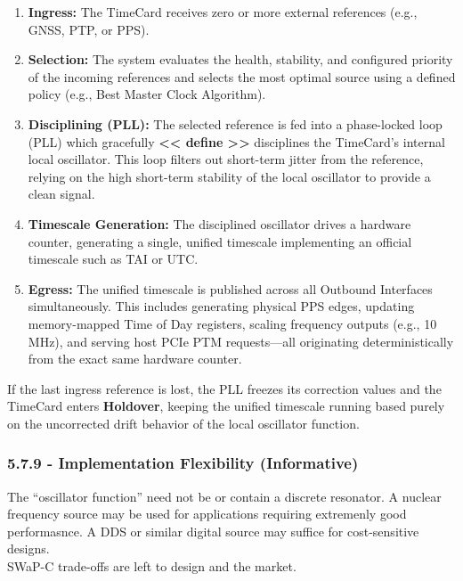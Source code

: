 \documentclass[
]{article}
\begin{document}
\begin{enumerate}
\item
  \textbf{Ingress:} The TimeCard receives zero or more external
  references (e.g., GNSS, PTP, or PPS).
\item
  \textbf{Selection:} The system evaluates the health, stability, and
  configured priority of the incoming references and selects the most
  optimal source using a defined policy (e.g., Best Master Clock
  Algorithm).
\item
  \textbf{Disciplining (PLL):} The selected reference is fed into a
  phase-locked loop (PLL) which gracefully \textbf{\textless\textless{}
  define \textgreater\textgreater{}} disciplines the TimeCard's internal
  local oscillator. This loop filters out short-term jitter from the
  reference, relying on the high short-term stability of the local
  oscillator to provide a clean signal.
\item
  \textbf{Timescale Generation:} The disciplined oscillator drives a
  hardware counter, generating a single, unified timescale implementing
  an official timescale such as TAI or UTC.
\item
  \textbf{Egress:} The unified timescale is published across all
  Outbound Interfaces simultaneously. This includes generating physical
  PPS edges, updating memory-mapped Time of Day registers, scaling
  frequency outputs (e.g., 10 MHz), and serving host PCIe PTM
  requests---all originating deterministically from the exact same
  hardware counter.
\end{enumerate}

If the last ingress reference is lost, the PLL freezes its correction
values and the TimeCard enters \textbf{Holdover}, keeping the unified
timescale running based purely on the uncorrected drift behavior of the
local oscillator function.

\subsubsection{5.7.9 - Implementation Flexibility
(Informative)}\label{implementation-flexibility-informative}

The ``oscillator function'' need not be or contain a discrete resonator.
A nuclear frequency source may be used for applications requiring
extremenly good performasnce. A DDS or similar digital source may
suffice for cost-sensitive designs.\\
SWaP-C trade-offs are left to design and the market.
\end{document}
